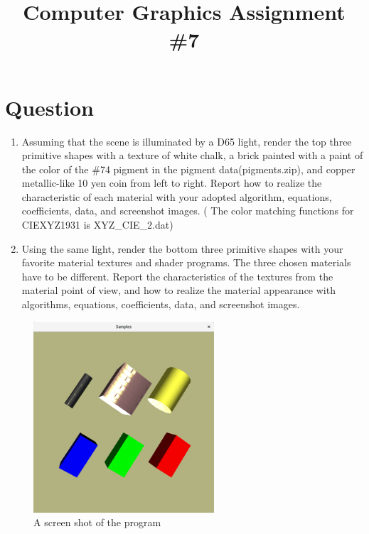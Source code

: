 

\usepackage{subfiles}
\usepackage{subcaption}
\usepackage{hyperref}
\usepackage{CJKutf8}

\title{Computer Graphics Assignment \#7}

\section{Question}
\begin{enumerate}
    \item Assuming that the scene is illuminated by a D65 light, render the top three primitive shapes with a texture of white chalk, a brick painted with a paint of the color of the \#74 pigment in the pigment data(pigments.zip), and copper metallic-like 10 yen coin from left to right. Report how to realize the characteristic of each material with your adopted algorithm, equations, coefficients, data, and screenshot images. ( The color matching functions for CIEXYZ1931 is XYZ\_CIE\_2.dat)
    
    \item Using the same light, render the bottom three primitive shapes with your favorite material textures and shader programs. The three chosen materials have to be different. Report the characteristics of the textures from the material point of view, and how to realize the material appearance with algorithms, equations, coefficients, data, and screenshot images.
\end{enumerate}

\begin{figure}[h]
    \centering
    \includegraphics[width=0.6\textwidth]{figures/assignment7/assignment7-example.png}
    \caption{A screen shot of the program}
\end{figure}

